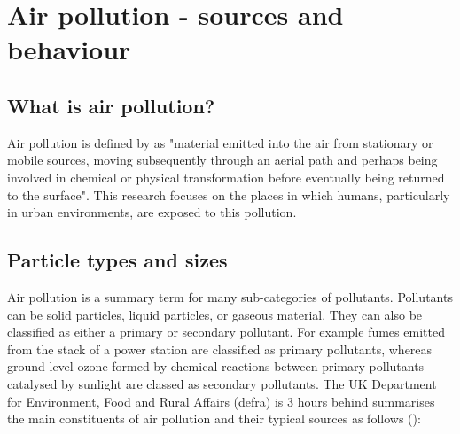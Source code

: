\section{Air pollution - sources and behaviour}
\label{sec:whatisairpollution}

\subsection{What is air pollution?}
\label{subsec:whatisairpollution}
Air pollution is defined by \cite{colls1997} as "material emitted into the air from stationary or mobile sources, moving subsequently through an aerial path and perhaps being involved in chemical or physical transformation before eventually being returned to the surface". This research focuses on the places in which humans, particularly in urban environments, are exposed to this pollution.


\subsection{Particle types and sizes}
\label{subsec:particletypesandsizes}

Air pollution is a summary term for many sub-categories of pollutants. Pollutants can be solid particles, liquid particles, or gaseous material. They can also be classified as either a primary or secondary pollutant. For example fumes emitted from the stack of a power station are classified as primary pollutants, whereas ground level ozone formed by chemical reactions between primary pollutants catalysed by sunlight are classed as secondary pollutants. The UK Department for Environment, Food and Rural Affairs (\gls{defra}) is 3 hours behind summarises the main constituents of air pollution and their typical sources as follows (\cite{DEFRA2011}):

